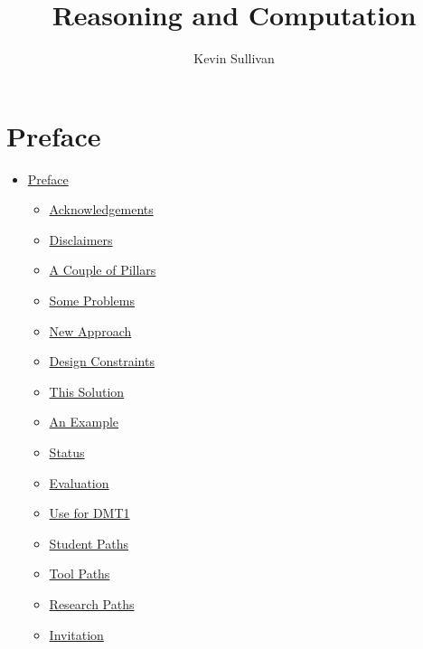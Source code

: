 \documentclass{book}
\title{Reasoning and Computation}
\author{Kevin Sullivan}
\providecommand{\tightlist}{%
  \setlength{\itemsep}{0pt}\setlength{\parskip}{0pt}}
\begin{document}
\maketitle
\newpage

\tableofcontents
\newpage

\hypertarget{book__pandoc__debug__src__preface.md}{}
\hypertarget{book__pandoc__debug__src__preface.md__preface}{%
\chapter*{Preface}\label{book__pandoc__debug__src__preface.md__preface}}

\begin{itemize}
\tightlist
\item
  \protect\hyperlink{book__pandoc__debug__src__preface.md__preface}{Preface}

  \begin{itemize}
  \tightlist
  \item
    \protect\hyperlink{book__pandoc__debug__src__preface.md__acknowledgements}{Acknowledgements}
  \item
    \protect\hyperlink{book__pandoc__debug__src__preface.md__disclaimers}{Disclaimers}
  \item
    \protect\hyperlink{book__pandoc__debug__src__preface.md__a-couple-of-pillars}{A Couple of Pillars}
  \item
    \protect\hyperlink{book__pandoc__debug__src__preface.md__some-problems}{Some Problems}
  \item
    \protect\hyperlink{book__pandoc__debug__src__preface.md__new-approach}{New Approach}
  \item
    \protect\hyperlink{book__pandoc__debug__src__preface.md__design-constraints}{Design Constraints}
  \item
    \protect\hyperlink{book__pandoc__debug__src__preface.md__this-solution}{This Solution}
  \item
    \protect\hyperlink{book__pandoc__debug__src__preface.md__an-example}{An Example}
  \item
    \protect\hyperlink{book__pandoc__debug__src__preface.md__status}{Status}
  \item
    \protect\hyperlink{book__pandoc__debug__src__preface.md__evaluation}{Evaluation}
  \item
    \protect\hyperlink{book__pandoc__debug__src__preface.md__use-for-dmt1}{Use for DMT1}
  \item
    \protect\hyperlink{book__pandoc__debug__src__preface.md__student-paths}{Student Paths}
  \item
    \protect\hyperlink{book__pandoc__debug__src__preface.md__tool-paths}{Tool Paths}
  \item
    \protect\hyperlink{book__pandoc__debug__src__preface.md__research-paths}{Research Paths}
  \item
    \protect\hyperlink{book__pandoc__debug__src__preface.md__invitation}{Invitation}
  \end{itemize}
\end{itemize}
\end{document}
